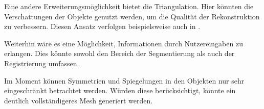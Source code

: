 Eine andere Erweiterungsmöglichkeit bietet die Triangulation.
Hier könnten die Verschattungen der Objekte genutzt werden, um die Qualität der Rekonstruktion zu verbessern.
Diesen Ansatz verfolgen beispielsweise auch \citeauthor{kazhdan2020poisson} in \cite{kazhdan2020poisson}.

Weiterhin wäre es eine Möglichkeit, Informationen durch Nutzereingaben zu erlangen.
Dies könnte sowohl den Bereich der Segmentierung als auch der Registrierung umfassen.

Im Moment können Symmetrien und Spiegelungen in den Objekten nur sehr eingeschränkt betrachtet werden.
Würden diese berücksichtigt, könnte ein deutlich vollständigeres Mesh generiert werden.


